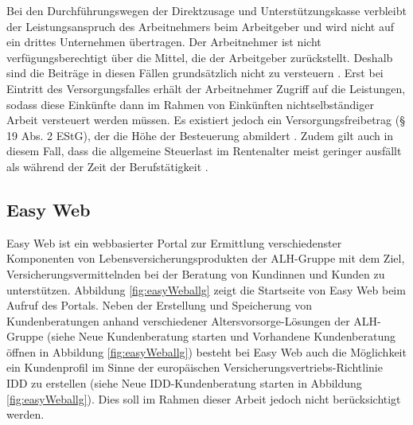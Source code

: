 Bei den Durchführungswegen der Direktzusage und Unterstützungskasse verbleibt der Leistungsanspruch des Arbeitnehmers beim Arbeitgeber und wird nicht auf ein drittes Unternehmen übertragen. Der Arbeitnehmer ist nicht \glqq verfügungsberechtigt\grqq{} \cite[S. 137]{buttler2017einfuehrung} über die Mittel, die der Arbeitgeber zurückstellt. Deshalb sind die Beiträge in diesen Fällen grundsätzlich nicht zu versteuern \cite[S. 138]{buttler2017einfuehrung}. Erst bei Eintritt des Versorgungsfalles erhält der Arbeitnehmer Zugriff auf die Leistungen, sodass diese Einkünfte dann im Rahmen von \glqq Einkünften nichtselbständiger Arbeit\grqq{} \cite[S. 138]{buttler2017einfuehrung} versteuert werden müssen. Es existiert jedoch ein Versorgungsfreibetrag (§ 19 Abs. 2 EStG), der die Höhe der Besteuerung abmildert \cite[S. 138]{buttler2017einfuehrung}. Zudem gilt auch in diesem Fall, dass die allgemeine Steuerlast im Rentenalter meist geringer ausfällt als während der Zeit der Berufstätigkeit \cite{verbraucherzentrale}.

\subsection{Easy Web}

Easy Web \cite{easy_web} ist ein webbasierter Portal zur Ermittlung verschiedenster Komponenten von Lebensversicherungsprodukten der ALH-Gruppe mit dem Ziel, Versicherungsvermittelnden bei der Beratung von Kundinnen und Kunden zu unterstützen. Abbildung \ref{fig:easyWeballg} zeigt die Startseite von Easy Web beim Aufruf des Portals. Neben der Erstellung und Speicherung von \glqq Kundenberatungen\grqq{} anhand verschiedener Altersvorsorge-Lösungen der ALH-Gruppe (siehe \glqq Neue Kundenberatung starten\grqq{} und \glqq Vorhandene Kundenberatung öffnen\grqq{} in Abbildung \ref{fig:easyWeballg}) besteht bei Easy Web auch die Möglichkeit ein Kundenprofil im Sinne der europäischen Versicherungsvertriebs-Richtlinie IDD zu erstellen (siehe \glqq Neue IDD-Kundenberatung starten\grqq{} in Abbildung \ref{fig:easyWeballg}). Dies soll im Rahmen dieser Arbeit jedoch nicht berücksichtigt werden. 

